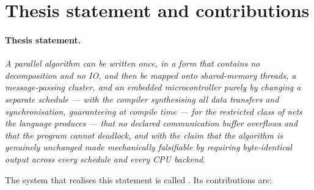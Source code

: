 \section{Thesis statement and contributions}\label{sec:intro-contributions}

\paragraph{Thesis statement.} \emph{A parallel algorithm can be written once, in
a form that contains no decomposition and no IO, and then be mapped onto
shared-memory threads, a message-passing cluster, and an embedded
microcontroller purely by changing a separate schedule --- with the compiler
synthesising all data transfers and synchronisation, guaranteeing at compile
time --- for the restricted class of nets the language produces --- that no declared
communication buffer overflows and that the program cannot
deadlock, and with the claim that the algorithm is genuinely unchanged made
mechanically falsifiable by requiring byte-identical output across every schedule
and every CPU backend.}

The system that realises this statement is called \nuc. Its contributions are:

